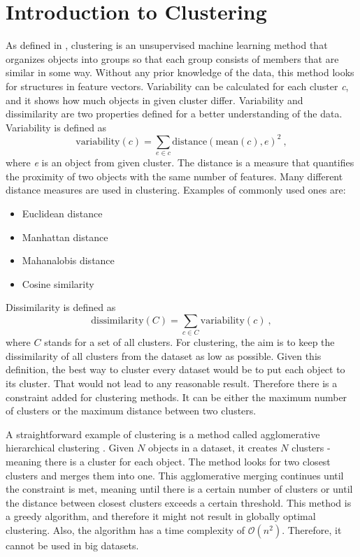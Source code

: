 \documentclass[thesis=B,english]{FITthesis}[2012/10/20]
\begin{document}
\section{Introduction to Clustering}\label{sec:clust_intro}
As defined in \cite{guttag2016introduction}, clustering is an unsupervised machine learning method that organizes objects into groups so that each group consists of members that are similar in some way.
Without any prior knowledge of the data, this method looks for structures in feature vectors.
Variability can be calculated for each cluster \textit{c}, and it shows how much objects in given cluster differ.
Variability and dissimilarity are two properties defined for a better understanding of the data.
Variability is defined as
\begin{equation}
\mathrm{variability}(c) = \sum_{e \in c} \mathrm{distance}(\mathrm{mean}(c), e)^2\:, \tag{3}
\end{equation}
where \textit{e} is an object from given cluster.
The distance is a measure that quantifies the proximity of two objects with the same number of features.
Many different distance measures are used in clustering.
Examples of commonly used ones are:
\begin{itemize}
    \item Euclidean distance
    \item Manhattan distance
    \item Mahanalobis distance
    \item Cosine similarity
\end{itemize}

Dissimilarity is defined as
\begin{equation}
\mathrm{dissimilarity}(C) = \sum_{c \in C} \mathrm{variability}(c)\:, \tag{4}
\end{equation}
where $C$ stands for a set of all clusters.
For clustering, the aim is to keep the dissimilarity of all clusters from the dataset as low as possible.
Given this definition, the best way to cluster every dataset would be to put each object to its cluster.
That would not lead to any reasonable result.
Therefore there is a constraint added for clustering methods.
It can be either the maximum number of clusters or the maximum distance between two clusters.

A straightforward example of clustering is a method called agglomerative hierarchical clustering \cite{guttag2016introduction}.
Given $N$ objects in a dataset, it creates $N$ clusters - meaning there is a cluster for each object.
The method looks for two closest clusters and merges them into one.
This agglomerative merging continues until the constraint is met, meaning until there is a certain number of clusters or until the distance between closest clusters exceeds a certain threshold.
This method is a greedy algorithm, and therefore it might not result in globally optimal clustering.
Also, the algorithm has a time complexity of $\mathcal{O}(n^2)$.
Therefore, it cannot be used in big datasets.
\end{document}
